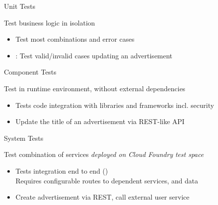 \begin{frame}{Unit Tests}
\begin{figure}
\end{figure}
\vfill
\begin{block}{Test business logic in isolation}
\begin{itemize}
	\item Test most combinations and error cases
	\item {}: Test valid/invalid cases updating an advertisement 
\end{itemize}
\end{block}
\end{frame}

\begin{frame}{Component Tests}
\begin{figure}
\end{figure}
\vfill
\begin{block}{Test in runtime environment, without external dependencies}
\begin{itemize}
	\item Tests code integration with libraries and frameworks incl. security
	\item {} Update the title of an advertisement via REST-like API
\end{itemize}
\end{block}
\end{frame}

\begin{frame}{System Tests}
\begin{figure}
\end{figure}
\vfill
\begin{block}{Test combination of services \textit{deployed on Cloud Foundry test space}}
\vspace{-2mm}
\begin{itemize}
	\item Tests integration end to end ()
	\\Requires configurable routes to dependent services, and data
	\item {} 
	Create advertisement via REST, call external user service
\end{itemize}
\vspace{-3mm}
\end{block}
\end{frame}

